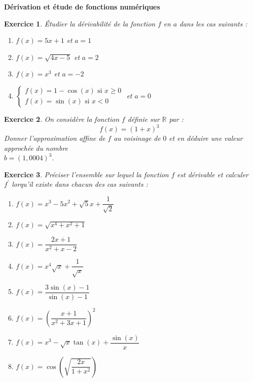 \documentclass[12pt,a4paper]{article}
\theoremstyle{mystyle}
\newtheorem{exo}{Exercice}
\begin{document}
\pagestyle{fancy}
\fancyhf{} %
\fancyfoot[C]{\thepage} %


\begin{center}
    \textbf{\Large Dérivation et étude de fonctions numériques}
\end{center}
\begin{multicols*}{2}

\begin{exo}
Étudier la dérivabilité de la fonction $f$ en $a$ dans les cas suivants :
\begin{enumerate}
	\item $f(x) = 5x + 1$ et $a = 1$
	\item $f(x) = \sqrt{4x - 5}$ et $a = 2$
	\item $f(x) = x^3$ et $a = -2$
	\item $\begin{cases}
		f(x) = 1 - \cos(x) \text{ si } x\geq 0 \\
		f(x) = \sin(x) \text{ si } x < 0
	\end{cases}	
	$ et $a = 0$
\end{enumerate}
\end{exo}

\begin{exo}
On considère la fonction $f$ définie sur $\mathbb{R}$ par : $$f(x) = (1+x)^3$$
Donner l'approximation affine de $f$ au voisinage de $0$ et en déduire une valeur approchée du nombre\\ $b = (1,0004)^3$.
\end{exo}

\begin{exo}
Préciser l'ensemble sur lequel la fonction $f$ est dérivable et calculer $f^{\prime}$ lorqu'il existe dans chacun des cas suivants :
\begin{enumerate}
	\item $f(x) = x^3 - 5x^2 +\sqrt{5}x + \dfrac{1}{\sqrt{2}}$
	\item $f(x) = \sqrt{x^4 + x^2 + 1}$	
	\item $f(x) = \dfrac{2x + 1}{x^2 + x - 2}$
	\item $f(x) = x^4\sqrt{x} + \dfrac{1}{\sqrt{x}}$
	\item $f(x)  = \dfrac{3\sin(x) - 1}{\sin(x) - 1}$
	\item $f(x) = \left(\dfrac{x + 1}{x^2 + 3x + 1}\right)^2$
	\item $f(x) = x^3 - \sqrt{x}\tan(x) + \dfrac{\sin(x)}{x}$
	\item $f(x) = \cos\left(\sqrt{\dfrac{2x}{1+x^2}}\right)$


\end{enumerate}
\end{exo}
\end{multicols*}
\end{document}
